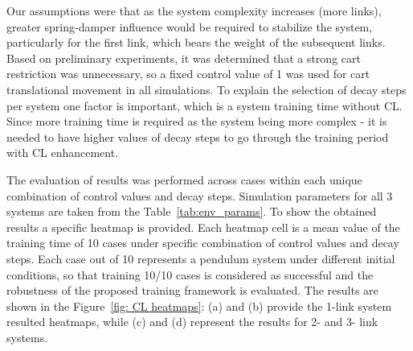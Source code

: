 Our assumptions were that as the system complexity increases (more links), greater spring-damper influence would be required to stabilize the system, particularly for the first link, which bears the weight of the subsequent links. Based on preliminary experiments, it was determined that a strong cart restriction was unnecessary, so a fixed control value of 1 was used for cart translational movement in all simulations. To explain the selection of decay steps per system one factor is important, which is a system training time without CL. Since more training time is required as the system being more complex - it is needed to have higher values of decay steps to go through the training period with CL enhancement.

The evaluation of results was performed across cases within each unique combination of control values and decay steps. Simulation parameters for all 3 systems are taken from the Table~\ref{tab:env_params}. To show the obtained results a specific heatmap is provided. Each heatmap cell is a mean value of the training time of 10 cases under specific combination of control values and decay steps. Each case out of 10 represents a pendulum system under different initial conditions, so that training 10/10 cases is considered as successful and the robustness of the proposed training framework is evaluated. The results are shown in the Figure~\ref{fig: CL heatmaps}: (a) and (b) provide the 1-link system resulted heatmaps, while (c) and (d) represent the results for 2- and 3- link systems.

